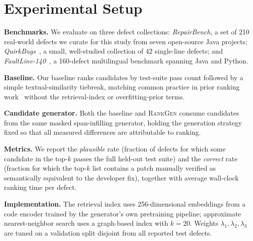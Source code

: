 \section{Experimental Setup}
\label{sec:setup}
\textbf{Benchmarks.} We evaluate on three defect collections: \emph{RepairBench}, a set of 210 real-world defects we curate for this study from seven open-source Java projects; \emph{QuirkBugs}~\cite{feldman2018quirkbugs}, a small, well-studied collection of 42 single-line defects; and \emph{FaultLine-140}~\cite{singh2023faultline}, a 160-defect multilingual benchmark spanning Java and Python.

\textbf{Baseline.} Our baseline ranks candidates by test-suite pass count followed by a simple textual-similarity tiebreak, matching common practice in prior ranking work~\cite{nakamura2020rag} without the retrieval-index or overfitting-prior terms.

\textbf{Candidate generator.} Both the baseline and \textsc{RankGen} consume candidates from the same masked span-infilling generator, holding the generation strategy fixed so that all measured differences are attributable to ranking.

\textbf{Metrics.} We report the \emph{plausible} rate (fraction of defects for which some candidate in the top-$k$ passes the full held-out test suite) and the \emph{correct} rate (fraction for which the top-$k$ list contains a patch manually verified as semantically equivalent to the developer fix), together with average wall-clock ranking time per defect.

\textbf{Implementation.} The retrieval index uses 256-dimensional embeddings from a code encoder trained by the generator's own pretraining pipeline; approximate nearest-neighbor search uses a graph-based index with $k{=}20$. Weights $\lambda_1,\lambda_2,\lambda_3$ are tuned on a validation split disjoint from all reported test defects.
